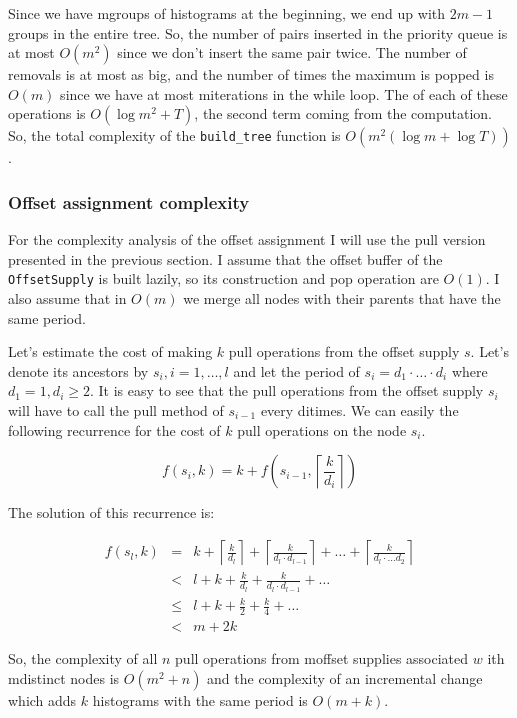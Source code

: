 

Since we have mgroups of histograms at the beginning, we end up with $2m-1$ groups in the entire tree. So, the number of pairs inserted in the priority queue is at most $O(m^2)$ since we don’t insert the same pair twice. The number of removals is at most as big, and the number of times the maximum is popped is $O(m)$ since we have at most miterations in the while loop. The of each of these operations is $O(\log m^2+T)$, the second term coming from the  computation. So, the total complexity of the \verb+build_tree+ function is $O(m^2(\log m + \log T))$. 

\subsubsection*{Offset assignment complexity}
For the complexity analysis of the offset assignment I will use the pull version presented in the previous section. I assume that the offset buffer of the \verb+OffsetSupply+ is built lazily, so its construction and pop operation are $O(1)$. I also assume that in $O(m)$ we merge all nodes with their parents that have the same period.

Let’s estimate the cost of making $k$ pull operations from the offset supply $s$. Let’s denote its ancestors by $s_i,i=1,\ldots,l$ and let the period of $s_i=d_1\cdot\ldots\cdot d_i$ where $d_1=1, d_i \geq 2$. It is easy to see that the pull operations from the offset supply $s_i$ will have to call the pull method of $s_{i-1}$ every ditimes. We can easily the following recurrence for the cost of $k$ pull operations on the node $s_i$.

$$ f(s_i, k) = k + f\left(s_{i-1}, \left\lceil \frac k {d_i} \right\rceil \right)$$

The solution of this recurrence is:

\begin{eqnarray*}
f(s_l,k) &=& k+ \left\lceil \frac k {d_l} \right\rceil + \left\lceil \frac k {d_l\cdot d_{l-1}} \right\rceil + \ldots + \left\lceil \frac k {d_l\cdot \ldots d_2}\right\rceil \\
         &<&l+k+\frac k {d_l}+ \frac k {d_l\cdot d_{l-1}} + \ldots \\
         &\leq & l+k+\frac k 2+\frac k 4 + \ldots \\
         &<& m+2k
\end{eqnarray*}

So, the complexity of all $n$ pull operations from moffset supplies associated $w$ ith mdistinct nodes is $O(m^2+n)$ and the complexity of an incremental change which adds $k$ histograms with the same period is $O(m+k)$. 

